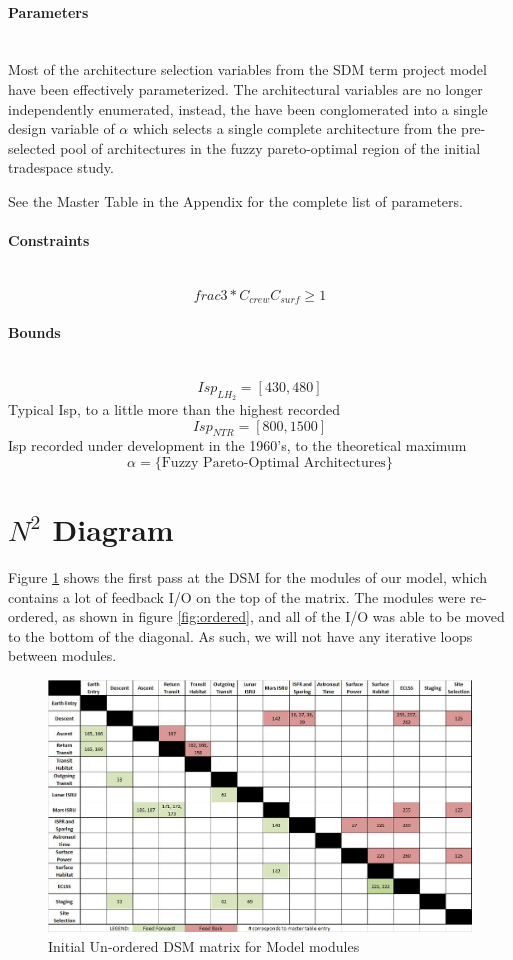 \documentclass[11pt]{article} %
\newcommand{\myparagraph}[1]{\paragraph{#1}\mbox{}\\}
\begin{document}
\myparagraph{Parameters}

Most of the architecture selection variables from the SDM term project model have been effectively parameterized.  The architectural variables are no longer independently enumerated, instead, the have been conglomerated into a single design variable of $\alpha$ which selects a single complete architecture from the pre-selected pool of architectures in the fuzzy pareto-optimal region of the initial tradespace study.

See the Master Table in the Appendix for the complete list of parameters.

\myparagraph{Constraints}

\begin{equation}
frac{3 * C_{crew}}{C_{surf}} \ge 1
\end{equation}

\myparagraph{Bounds}

\begin{equation*}
Isp_{LH_2}=[430,480]
\end{equation*}
Typical Isp, to a little more than the highest recorded
\begin{equation*}
Isp_{NTR}=[800,1500]
\end{equation*}
Isp recorded under development in the 1960's, to the theoretical maximum
\begin{equation*}
\alpha = \{\mbox{Fuzzy Pareto-Optimal Architectures}\}
\end{equation*}

\clearpage
\section{$N^2$ Diagram}

Figure \ref{fig:unordered} shows the first pass at the DSM for the modules of our model, which contains a lot of feedback I/O on the top of the matrix.  The modules were re-ordered, as shown in figure \ref{fig:ordered}, and all of the I/O was able to be moved to the bottom of the diagonal. As such, we will not have any iterative loops between modules.

\begin{figure}
\includegraphics[width=\textwidth]{UnOrderedDSM}
\caption{Initial Un-ordered DSM matrix for Model modules}
\label{fig:unordered}
\end{figure}
\end{document}
